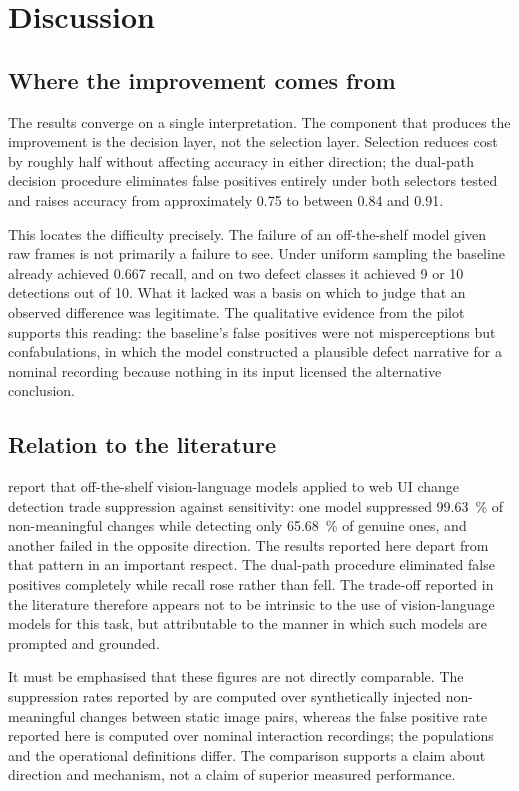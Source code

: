 \section{Discussion}
\label{sec:discussion}

\subsection{Where the improvement comes from}

The results converge on a single interpretation. The component that
produces the improvement is the decision layer, not the selection layer.
Selection reduces cost by roughly half without affecting accuracy in
either direction; the dual-path decision procedure eliminates false
positives entirely under both selectors tested and raises accuracy from
approximately 0.75 to between 0.84 and 0.91.

This locates the difficulty precisely. The failure of an off-the-shelf
model given raw frames is not primarily a failure to see. Under uniform
sampling the baseline already achieved 0.667 recall, and on two defect
classes it achieved 9 or 10 detections out of 10. What it lacked was a
basis on which to judge that an observed difference was legitimate. The
qualitative evidence from the pilot supports this reading: the baseline's
false positives were not misperceptions but confabulations, in which the
model constructed a plausible defect narrative for a nominal recording
because nothing in its input licensed the alternative conclusion.

\subsection{Relation to the literature}

\citet{zhang2026beyond} report that off-the-shelf vision-language models
applied to web UI change detection trade suppression against sensitivity:
one model suppressed \SI{99.63}{\percent} of non-meaningful changes while
detecting only \SI{65.68}{\percent} of genuine ones, and another failed in
the opposite direction. The results reported here depart from that pattern
in an important respect. The dual-path procedure eliminated false
positives completely while recall rose rather than fell. The trade-off
reported in the literature therefore appears not to be intrinsic to the
use of vision-language models for this task, but attributable to the
manner in which such models are prompted and grounded.

It must be emphasised that these figures are not directly comparable. The
suppression rates reported by \citet{zhang2026beyond} are computed over
synthetically injected non-meaningful changes between static image pairs,
whereas the false positive rate reported here is computed over nominal
interaction recordings; the populations and the operational definitions
differ. The comparison supports a claim about direction and mechanism, not
a claim of superior measured performance.

